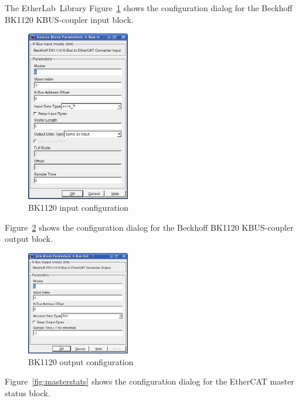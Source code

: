 \begin{ighsec}{The EtherLab\regTM\ Library}
Figure~\ref{fig:bk1120-in} shows the configuration dialog for the Beckhoff
BK1120 KBUS-coupler input block.

\begin{figure}[H]
  \begin{center}
    \includegraphics[width=0.4\textwidth]{images/bk1120-in.png}
    \caption{BK1120 input configuration}
    \label{fig:bk1120-in}
  \end{center}
\end{figure}

Figure~\ref{fig:bk1120-out} shows the configuration dialog for the Beckhoff
BK1120 KBUS-coupler output block.

\begin{figure}[H]
  \begin{center}
    \includegraphics[width=0.4\textwidth]{images/bk1120-out.png}
    \caption{BK1120 output configuration}
    \label{fig:bk1120-out}
  \end{center}
\end{figure}

Figure~\ref{fig:masterstats} shows the configuration dialog for the EtherCAT
master status block.


\end{ighsec}
